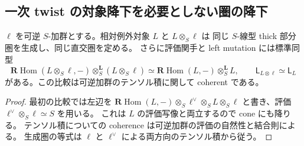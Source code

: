 \subsection{一次 twist の対象降下を必要としない圏の降下}

\begin{lemma}[基底上の可逆加群に対する不変性]
\label{lem:kuznetsov-line-twist-invariance}
$\ell$ を可逆 $S$-加群とする。相対例外対象 $L$ と $L\otimes_S\ell$ は
同じ $S$-線型 thick 部分圏を生成し、同じ直交圏を定める。
さらに評価関手と left mutation には標準同型
\[
 \mathbf R\operatorname{Hom}(L\otimes_S\ell,-)
             \otimes_S^{\mathbf L}(L\otimes_S\ell)
 \simeq \mathbf R\operatorname{Hom}(L,-)\otimes_S^{\mathbf L}L,
 \qquad\mathsf L_{L\otimes\ell}\simeq\mathsf L_L
\]
がある。この比較は可逆加群のテンソル積に関して coherent である。
\end{lemma}
\begin{proof}
最初の比較では左辺を
$\mathbf R\operatorname{Hom}(L,-)\otimes_S\ell^\vee\otimes_S L\otimes_S\ell$
と書き、評価 $\ell^\vee\otimes_S\ell\simeq S$ を用いる。
これは $L$ の評価写像と両立するので cone にも降りる。
テンソル積についての coherence は可逆加群の評価の自然性と結合則による。
生成圏の等式は $\ell$ と $\ell^\vee$ による両方向のテンソル積から従う。
\end{proof}

